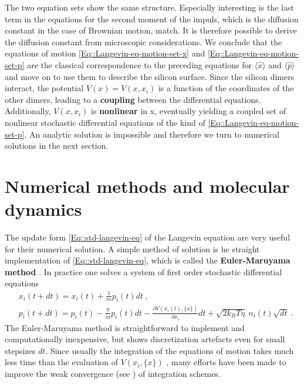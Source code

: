 	The two equation sets show the same structure. Especially interesting is the last term in the equations for the second moment of the impuls, which is the diffusion constant in the case of Brownian motion, match. It is therefore possible to derive the diffusion constant from microscopic considerations. We conclude that the equations of motion \autoref{Eq::Langevin-eq-motion-set-x} and \autoref{Eq::Langevin-eq-motion-set-p} are the classical correspondence to the preceding equations for $\langle \hat{x} \rangle$ and $\langle \hat{p} \rangle$ and move on to use them to describe the silicon surface. Since the silicon dimers interact, the potential $V(x) =	V(x, {x_i})$ is a function of the coordinates of the other dimers, leading to a \textbf{coupling} between the differential equations. Additionally, $V(x, {x_i})$ is \textbf{nonlinear} in x, eventually yielding a coupled set of nonlinear stochastic differential equations of the kind of \autoref{Eq::Langevin-eq-motion-set-p}. An analytic solution is impossible and therefore we turn to numerical solutions in the next section.
	\section{Numerical methods and molecular dynamics} \label{Section::Numerical-methods}
	The update form \autoref{Eq::std-langevin-eq} of the Langevin equation are very useful for their numerical solution. A simple method of solution is he straight implementation of \autoref{Eq::std-langevin-eq}, which is called the \textbf{Euler-Maruyama method} \cite{kloeden1992stochastic}. In practice one solves a system of first order stochastic differential equations
	\begin{align}
		&x_i(t + dt) = x_i(t)	+ \frac{1}{m} p_i(t) dt ~, \\
		&p_i(t + dt) =	p_i(t) - \frac{\eta}{m} p_i(t) dt - \frac{\partial V(x_i(t), \{x\})}{\partial x_i} dt + \sqrt{2 k_B T \eta} ~ n_i(t) \sqrt{dt} ~.
	\end{align}
	The Euler-Maruyama method is straightforward to implement and computationally inexpensive, but shows discretization artefacts even for small stepsizes $dt$. Since usually the integration of the equations of motion takes much less time than the evaluation of $V(x_i, \{x\})$ \cite{frenkel2023understanding}, many efforts have been made to improve the weak convergence (see \cite{kloeden1992stochastic}) of integration schemes. \\
	
